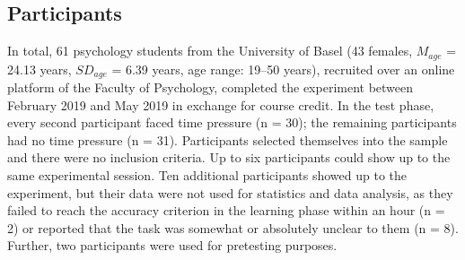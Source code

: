 \documentclass[a4paper,man,natbib]{apa6}
\begin{document}
\subsection{Participants}
In total, 61 psychology students from the University of Basel (43 females, $M_{age}$ = 24.13 years, $SD_{age}$ = 6.39 years, age range: 19--50 years), recruited over an online platform of the Faculty of Psychology, completed the experiment between February 2019 and May 2019 in exchange for course credit. In the test phase, every second participant faced time pressure (n = 30); the remaining participants had no time pressure (n = 31).
Participants selected themselves into the sample and there were no inclusion criteria. Up to six participants could show up to the same experimental session. Ten additional participants showed up to the experiment, but their data were not used for statistics and data analysis, as they failed to reach the accuracy criterion in the learning phase within an hour (n = 2) or reported that the task was somewhat or absolutely unclear to them (n = 8). Further, two participants were used for pretesting purposes. 
\end{document}
